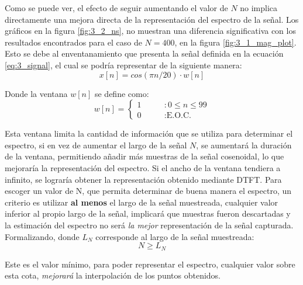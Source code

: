 	Como se puede ver, el efecto de seguir aumentando el valor de $N$ no implica directamente una mejora directa de la representación del espectro de la señal. Los gráficos en la figura \ref{fig:3_2_ns}, no muestran una diferencia significativa con los resultados encontrados para el caso de $N = 400$, en la figura \ref{fig:3_1_mag_plot}. Esto se debe al enventanamiento que presenta la señal definida en la ecuación \ref{eq:3_signal}, el cual se podría representar de la siguiente manera:
	\begin{equation}
		x[n] = cos(\pi n /20) \cdot w[n]
	\end{equation}
	
	Donde la ventana $w[n]$ se define como:
	\begin{equation}
		w[n] = \begin{cases}
							1  & \qquad : 0 \leq n \leq 99 \\
							0  & \qquad : \text{E.O.C.}
						\end{cases}
						\label{eq:3_signal}
	\end{equation}
	
	Esta ventana limita la cantidad de información que se utiliza para determinar el espectro, si en vez de aumentar el largo de la señal $N$, se aumentará la duración de la ventana, permitiendo añadir más muestras de la señal cosenoidal, lo que mejoraría la representación del espectro. Si el ancho de la ventana tendiera a infinito, se lograría obtener la representación obtenido mediante \textsc{DTFT}. Para escoger un valor de N, que permita determinar de buena manera el espectro, un criterio es utilizar \textbf{al menos} el largo de la señal muestreada, cualquier valor inferior al propio largo de la señal, implicará que muestras fueron descartadas y la estimación del espectro no será \textit{la mejor} representación de la señal capturada. Formalizando, donde $L_{N}$ corresponde al largo de la señal muestreada:
	\begin{equation}
		N \geq L_{N}
	\end{equation}
	
	Este es el valor mínimo, para poder representar el espectro, cualquier valor sobre esta cota, \textit{mejorará} la interpolación de los puntos obtenidos. 